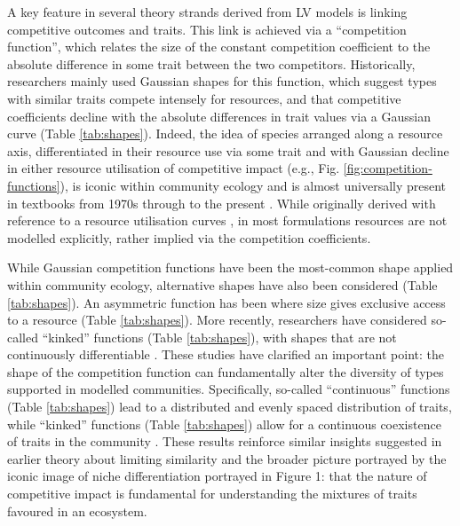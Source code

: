 \documentclass[a4paper,11pt]{article}
\begin{document}
A key feature in several theory strands derived from LV models is linking competitive outcomes and traits. This link is achieved via a ``competition function'', which relates the size of the constant competition coefficient to the absolute difference in some trait between the two competitors. Historically, researchers mainly used Gaussian shapes for this function, which suggest types with similar traits compete intensely for resources, and that competitive coefficients decline with the absolute differences in trait values via a Gaussian curve (Table \ref{tab:shapes}). Indeed, the idea of species arranged along a resource axis, differentiated in their resource use via some trait and with Gaussian decline in either resource utilisation of competitive impact (e.g., Fig. \ref{fig:competition-functions}), is iconic within community ecology and is almost universally present in textbooks from 1970s through to the present \citep[e.g.,][]{Krebs-1972, Ricklefs-1973, Ricklefs-1999, Krebs-2013}. While originally derived with reference to a resource utilisation curves \citep{MacArthur-1967, Roughgarden-1979}, in most formulations resources are not modelled explicitly, rather implied via the competition coefficients.

While Gaussian competition functions have been the most-common shape applied within community ecology, alternative shapes have also been considered (Table \ref{tab:shapes}). An asymmetric function has been where size gives exclusive access to a resource \citep[e.g.]{Law-1997, Kisdi-1999, Geritz-1999, Egas-2004, Calcagno-2006, DAndrea-2013} (Table \ref{tab:shapes}). More recently, researchers have considered so-called ``kinked'' functions (Table \ref{tab:shapes}), with shapes that are not continuously differentiable \citep{Calcagno-2006, Scheffer-2006, Pigolotti-2007, Leimar-2013, Barabas-2013}. These studies have clarified an important point: the shape of the competition function can fundamentally alter the diversity of types supported in modelled communities. Specifically, so-called ``continuous'' functions (Table \ref{tab:shapes}) lead to a distributed and evenly spaced distribution of traits, while ``kinked'' functions (Table \ref{tab:shapes}) allow for a continuous coexistence of traits in the community \citep{Scheffer-2006, Pigolotti-2007, Leimar-2013, Barabas-2013, DAndrea-2013}. These results reinforce similar insights suggested in earlier theory about limiting similarity \citep{Abrams-1983} and the broader picture portrayed by the iconic image of niche differentiation portrayed in Figure 1: that the nature of competitive impact is fundamental for understanding the mixtures of traits favoured in an ecosystem.
\end{document}
